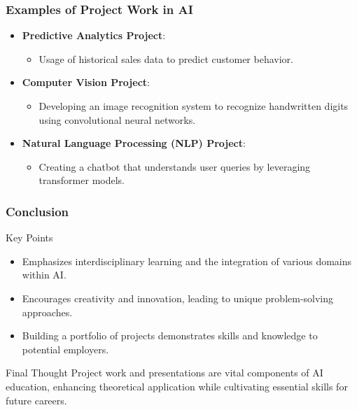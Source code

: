 \documentclass[aspectratio=169]{beamer}
\begin{document}
\begin{frame}[fragile]
    \frametitle{Examples of Project Work in AI}
    \begin{itemize}
        \item \textbf{Predictive Analytics Project}: 
            \begin{itemize}
                \item Usage of historical sales data to predict customer behavior.
            \end{itemize}
        
        \item \textbf{Computer Vision Project}:
            \begin{itemize}
                \item Developing an image recognition system to recognize handwritten digits using convolutional neural networks.
            \end{itemize}
        
        \item \textbf{Natural Language Processing (NLP) Project}:
            \begin{itemize}
                \item Creating a chatbot that understands user queries by leveraging transformer models.
            \end{itemize}
    \end{itemize}
\end{frame}

\begin{frame}[fragile]
    \frametitle{Conclusion}
    \begin{block}{Key Points}
        \begin{itemize}
            \item Emphasizes interdisciplinary learning and the integration of various domains within AI.
            \item Encourages creativity and innovation, leading to unique problem-solving approaches.
            \item Building a portfolio of projects demonstrates skills and knowledge to potential employers.
        \end{itemize}
    \end{block}
    
    \begin{block}{Final Thought}
        Project work and presentations are vital components of AI education, enhancing theoretical application while cultivating essential skills for future careers.
    \end{block}
\end{frame}
\end{document}
